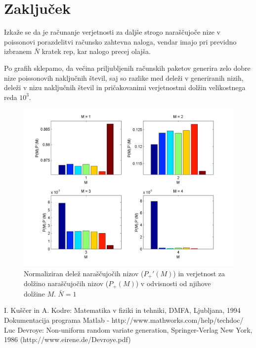 \documentclass{article}[12pt]
\begin{document}
\newpage

\section{Zaključek}
Izkaže se da je računanje verjetnosti za daljše strogo naraščujoče nize v poissonovi porazdelitvi računsko zahtevna naloga, vendar imajo pri previdno izbranem $\bar{N}$ kratek rep, kar nalogo precej olajša.

Po grafih sklepamo, da večina priljubljenih računskih paketov generira zelo dobre nize poissonovih naključnih števil, saj so razlike med deleži v generiranih nizih, deleži v nizu naključnih števil in pričakovanimi verjetnostmi dolžin velikostnega reda $10^3$.

\begin{figure}[H]
\begin{center}
\includegraphics[width=13cm]{slike/plot6}
\caption{Normaliziran delež naraščujočih nizov ($P_+'(M)$) in verjetnost za dolžino naraščujočih nizov ($P_+(M)$) v odvisnosti od njihove dolžine $M$. $\bar{N}=1$}
\label{plot6}
\end{center}
\end{figure}

\begin{thebibliography}{99}

 I. Kuščer in A. Kodre: Matematika v fiziki in tehniki, DMFA, Ljubljana, 1994
 Dokumentacija programa Matlab - http://www.mathworks.com/help/techdoc/
 Luc Devroye: Non-uniform random variate generation, Springer-Verlag New York, 1986 (http://www.eirene.de/Devroye.pdf)

\end{thebibliography}
\end{document}
